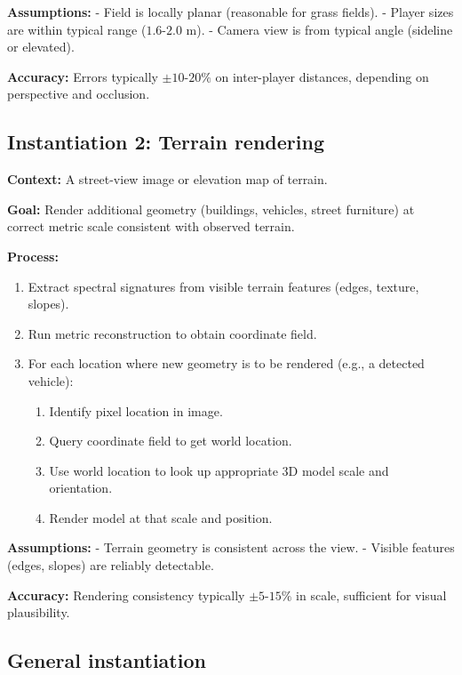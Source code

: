 \documentclass[11pt,twocolumn,a4paper]{article}
\theoremstyle{definition}
\begin{document}
\textbf{Assumptions:}
- Field is locally planar (reasonable for grass fields).
- Player sizes are within typical range ($1.6$-$2.0$ m).
- Camera view is from typical angle (sideline or elevated).

\textbf{Accuracy:} Errors typically $\pm 10$-$20\%$ on inter-player distances, depending on perspective and occlusion.

\subsection{Instantiation 2: Terrain rendering}

\textbf{Context:} A street-view image or elevation map of terrain.

\textbf{Goal:} Render additional geometry (buildings, vehicles, street furniture) at correct metric scale consistent with observed terrain.

\textbf{Process:}

\begin{enumerate}[leftmargin=1.4em]
  \item Extract spectral signatures from visible terrain features (edges, texture, slopes).
  \item Run metric reconstruction to obtain coordinate field.
  \item For each location where new geometry is to be rendered (e.g., a detected vehicle):
    \begin{enumerate}[leftmargin=1.4em]
      \item Identify pixel location in image.
      \item Query coordinate field to get world location.
      \item Use world location to look up appropriate 3D model scale and orientation.
      \item Render model at that scale and position.
    \end{enumerate}
\end{enumerate}

\textbf{Assumptions:}
- Terrain geometry is consistent across the view.
- Visible features (edges, slopes) are reliably detectable.

\textbf{Accuracy:} Rendering consistency typically $\pm 5$-$15\%$ in scale, sufficient for visual plausibility.

\subsection{General instantiation}
\end{document}
